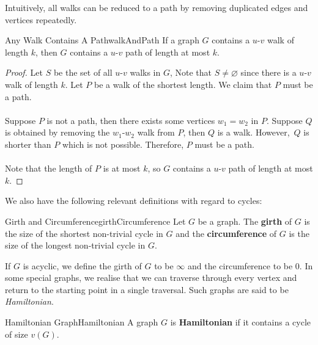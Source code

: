 \documentclass[math, code]{amznotes}
\theoremstyle{remark}
\begin{document}
Intuitively, all walks can be reduced to a path by removing duplicated edges and vertices repeatedly.
\begin{probox}{Any Walk Contains A Path}{walkAndPath}
    If a graph $G$ contains a $u$-$v$ walk of length $k$, then $G$ contains a $u$-$v$ path of length at most $k$.
    \tcblower
    \begin{proof}
        Let $S$ be the set of all $u$-$v$ walks in $G$, Note that $S \neq \varnothing$ since there is a $u$-$v$ walk of length $k$. Let $P$ be a walk of the shortest length. We claim that $P$ must be a path.
        \\\\
        Suppose $P$ is not a path, then there exists some vertices $w_1 = w_2$ in $P$. Suppose $Q$ is obtained by removing the $w_1$-$w_2$ walk from $P$, then $Q$ is a walk. However,~$Q$ is shorter than $P$ which is not possible. Therefore, $P$ must be a path.
        \\\\
        Note that the length of $P$ is at most $k$, so $G$ contains a $u$-$v$ path of length at most $k$.
    \end{proof}
\end{probox}

We also have the following relevant definitions with regard to cycles:
\begin{dfnbox}{Girth and Circumference}{girthCircumference}
    Let $G$ be a graph. The {\color{red} \textbf{girth}} of $G$ is the size of the shortest non-trivial cycle in $G$ and the {\color{red} \textbf{circumference}} of $G$ is the size of the longest non-trivial cycle in $G$.
\end{dfnbox}
If $G$ is acyclic, we define the girth of $G$ to be $\infty$ and the circumference to be $0$. In some special graphs, we realise that we can traverse through every vertex and return to the starting point in a single traversal. Such graphs are said to be \textit{Hamiltonian}.
\begin{dfnbox}{Hamiltonian Graph}{Hamiltonian}
    A graph $G$ is {\color{red} \textbf{Hamiltonian}} if it contains a cycle of size $v(G)$.
\end{dfnbox}
\end{document}
